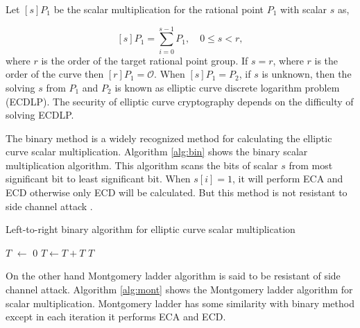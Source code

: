         Let $[s]P_1$ be the scalar multiplication for the rational point $P_1$ with scalar $s$ as,
        
        \begin{equation}\label{scalar_mul}
        [s]P_1 = \sum_{i=0}^{s-1} P_1, \quad \text{$0 \leq s < r$},
        \end{equation}
        where $r$ is the order of the target rational point group. If $s = r$, where $r$ is the order of the curve then $[r]P_1 = \mathcal{O}$. When $[s]P_1 = P_2$, if $s$ is unknown, then the solving $s$ from $P_1$ and $P_2$ is known as elliptic curve discrete logarithm problem (ECDLP). The security of elliptic curve cryptography depends on the difficulty of solving ECDLP.
        
        The binary method is a widely recognized method for calculating the elliptic curve scalar multiplication. Algorithm \ref{alg:bin} shows the binary scalar multiplication algorithm. This algorithm scans the bits of scalar $s$ from  most significant bit to least significant bit. When $s[i] = 1$, it will perform ECA and ECD otherwise only ECD will be calculated. But this method is not resistant to side channel attack \cite{C:Kocher96}.  
        
         \begin{algorithm}[H]
          \caption{Left-to-right binary algorithm for elliptic curve scalar multiplication}
          \label{alg:bin}
          \DontPrintSemicolon
          \hspace{-3ex}
          \;
          \hspace{-3ex}
           \;%
          \nl $T$ $ \leftarrow$ $0$ \;
          \nl {} {\;
                  $T \leftarrow T  + T$\;
              }\;
          \nl {} $T$\;
          \end{algorithm}
        
        On the other hand Montgomery ladder algorithm is said to be resistant of side channel attack. Algorithm \ref{alg:mont} shows the Montgomery ladder algorithm for scalar multiplication. Montgomery ladder has some similarity with binary method except in each iteration it performs ECA and ECD. 
        
